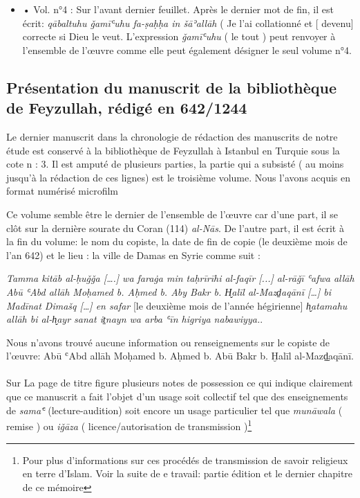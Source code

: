\documentclass[a4paper,12pt]{report}
\begin{document}
\begin{itemize}
\begin{enumerate}
\begin{itemize}
\begin{itemize}
    \item •	Vol. n°4 : Sur l’avant dernier feuillet. Après le dernier mot de fin, il est écrit:  \textit{qābaltuhu ǧamīʿuhu fa-ṣaḥḥa in šāʾallāh} ( Je l'ai  collationné et [  devenu] correcte si Dieu le veut. L'expression \textit{ǧamīʿuhu} ( le tout ) peut renvoyer à l’ensemble de l’œuvre comme elle peut également  désigner le seul volume n°4. 


\end{itemize}

    
\end{itemize}
\newpage
\subsection{ 	Présentation du manuscrit de la bibliothèque de Feyzullah, rédigé en 642/1244  }

Le dernier  manuscrit dans la chronologie de rédaction des manuscrits de notre étude  est conservé à la bibliothèque de Feyzullah à Istanbul en Turquie sous la cote n : 3. Il est amputé de plusieurs parties, la partie qui a subsisté ( au moins jusqu'à la rédaction de ces lignes)  est le troisième volume. Nous l'avons acquis en format numérisé microfilm 

Ce volume semble être le dernier de l'ensemble de l'œuvre car d'une part, il se clôt sur la dernière sourate du Coran (114) \textit{al-Nās}. De l'autre part, il est  écrit à la fin du volume: le nom du copiste, la date de fin de copie (le deuxième mois de l'an 642) et le lieu : la ville de Damas en Syrie comme suit :  
\begin{center}
    
\textit{
Tamma kitāb al-ḥuǧǧa [….] wa faraġa min taḥrīrīhi al-faqīr [...] al-rāǧī ʿafwa allāh Abū ʿAbd allāh Moḥamed b. Aḥmed b. Aby Bakr b. H̬alīl al-Mazd̠aqānī […] bi Madīnat Dimašq […] en safar} [le deuxième mois de l’année hégirienne] \textit{h̬atamahu allāh bi al-h̬ayr sanat it̠nayn wa arba ʿīn higriya nabawiyya.}. 

\end{center}
    
Nous n'avons  trouvé aucune information ou renseignements  sur le copiste de l'œuvre: Abū ʿAbd allāh Moḥamed b. Aḥmed b. Abū Bakr b. Ḫalīl al-Mazḏ̠aqānī.

\paragraph{}
 Sur La page de titre figure plusieurs notes  de possession ce qui indique clairement que ce manuscrit a fait l'objet  d'un usage  soit collectif tel que  des enseignements  de \textit{ samaʿ̄} (lecture-audition)   soit encore un usage  particulier tel que   \textit{munāwala}  (  remise )  ou    \textit{iǧāza} ( licence/autorisation de transmission )\footnote{ Pour plus d'informations sur ces procédés de transmission de savoir religieux en terre  d'Islam. Voir la suite de e travail: partie édition et le dernier chapitre de ce mémoire}       


\end{enumerate}
\end{itemize}
\end{document}
